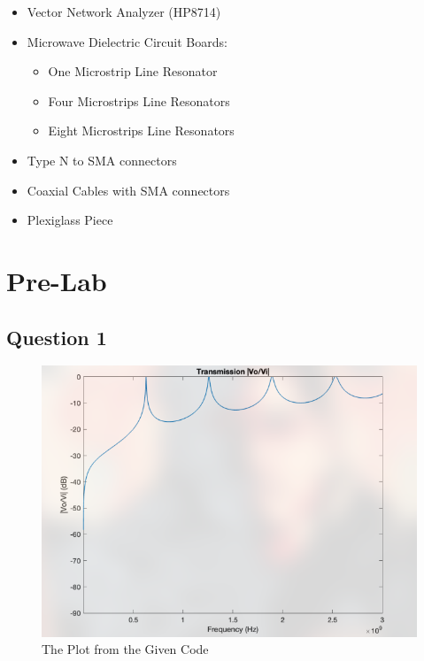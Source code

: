 \documentclass[
	letterpaper, %
	10pt, %
]{CSUniSchoolLabReport}
\begin{document}
\begin{itemize}

  \item Vector Network Analyzer (HP8714)

  \item Microwave Dielectric Circuit Boards:

    \begin{itemize}

      \item One Microstrip Line Resonator

      \item Four Microstrips Line Resonators

      \item Eight Microstrips Line Resonators

    \end{itemize}

  \item Type N to SMA connectors

  \item Coaxial Cables with SMA connectors

  \item Plexiglass Piece

\end{itemize}

\section{Pre-Lab}

\subsection{Question 1}

\begin{figure}[H]
  \centering
  \includegraphics[width=.9\textwidth]{Figures/Lab Three/InitGraph.png}
  \caption{The Plot from the Given Code}
  \label{fig:1}
\end{figure}
\end{document}
